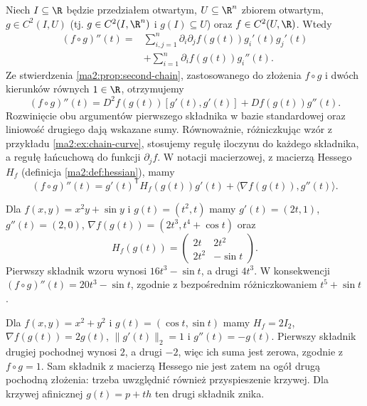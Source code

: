 \begin{przyklad}
\label{ma2:ex:second-chain-curve}
Niech $I\subseteq\R$ będzie przedziałem otwartym,
$U\subseteq\R^n$ zbiorem otwartym, $g\in C^2(I,U)$
(tj. $g\in C^2(I,\R^n)$ i $g(I)\subseteq U$)
oraz $f\in C^2(U,\R)$. Wtedy
\[
 \begin{aligned}
 (f\circ g)''(t)
 ={}&\sum_{i,j=1}^n
 \partial_i\partial_j f(g(t))g_i'(t)g_j'(t)\\
 &+\sum_{i=1}^n\partial_i f(g(t))g_i''(t).
 \end{aligned}
\]
Ze stwierdzenia \ref{ma2:prop:second-chain},
zastosowanego do złożenia $f\circ g$ i dwóch
kierunków równych $1\in\R$, otrzymujemy
\[
 (f\circ g)''(t)
 =D^2f(g(t))[g'(t),g'(t)]+Df(g(t))g''(t).
\]
Rozwinięcie obu argumentów pierwszego składnika
w bazie standardowej oraz liniowość drugiego dają
wskazane sumy. Równoważnie, różniczkując wzór
z przykładu \ref{ma2:ex:chain-curve}, stosujemy
regułę iloczynu do każdego składnika, a regułę
łańcuchową do funkcji $\partial_j f$.
W notacji macierzowej, z macierzą Hessego
$H_f$ (definicja \ref{ma2:def:hessian}), mamy
\[
 (f\circ g)''(t)=
 g'(t)^{\mathsf T}H_f(g(t))g'(t)
 +\langle\nabla f(g(t)),g''(t)\rangle.
\]

Dla $f(x,y)=x^2y+\sin y$ i $g(t)=(t^2,t)$
mamy $g'(t)=(2t,1)$, $g''(t)=(2,0)$,
$\nabla f(g(t))=(2t^3,t^4+\cos t)$ oraz
\[
 H_f(g(t))=\begin{pmatrix}2t&2t^2\\
                         2t^2&-\sin t\end{pmatrix}.
\]
Pierwszy składnik wzoru wynosi $16t^3-\sin t$,
a drugi $4t^3$. W konsekwencji
$(f\circ g)''(t)=20t^3-\sin t$, zgodnie
z bezpośrednim różniczkowaniem $t^5+\sin t$.

Dla $f(x,y)=x^2+y^2$ i $g(t)=(\cos t,\sin t)$
mamy $H_f=2I_2$, $\nabla f(g(t))=2g(t)$,
$\|g'(t)\|_2=1$ i $g''(t)=-g(t)$.
Pierwszy składnik drugiej pochodnej wynosi $2$,
a drugi $-2$, więc ich suma jest zerowa,
zgodnie z $f\circ g=1$. Sam składnik z macierzą
Hessego nie jest zatem na ogół drugą pochodną
złożenia: trzeba uwzględnić również przyspieszenie
krzywej. Dla krzywej afinicznej $g(t)=p+th$
ten drugi składnik znika.
\end{przyklad}

